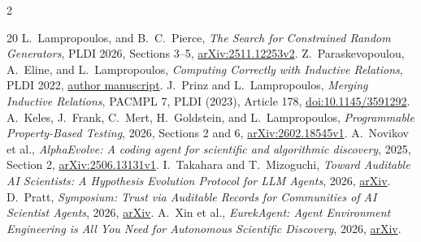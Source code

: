 \documentclass[10pt]{article}
\begin{document}
{\begin{multicols}{2}
\begin{thebibliography}{20}
L.~Lampropoulos, and B.~C.~Pierce, \emph{The Search for Constrained Random
Generators}, PLDI 2026, Sections 3--5,
\href{https://arxiv.org/abs/2511.12253v2}{arXiv:2511.12253v2}.
 Z.~Paraskevopoulou, A.~Eline, and L.~Lampropoulos,
\emph{Computing Correctly with Inductive Relations}, PLDI 2022,
\href{https://lemonidas.github.io/pdf/ComputingCorrectly.pdf}{author manuscript}.
 J.~Prinz and L.~Lampropoulos,
\emph{Merging Inductive Relations}, PACMPL 7, PLDI (2023), Article 178,
\href{https://doi.org/10.1145/3591292}{doi:10.1145/3591292}.
 A.~Keles, J.~Frank, C.~Mert, H.~Goldstein, and
L.~Lampropoulos, \emph{Programmable Property-Based Testing}, 2026,
Sections 2 and 6, \href{https://arxiv.org/abs/2602.18545v1}{arXiv:2602.18545v1}.
 A.~Novikov et al., \emph{AlphaEvolve: A coding agent
for scientific and algorithmic discovery}, 2025, Section 2,
\href{https://arxiv.org/abs/2506.13131v1}{arXiv:2506.13131v1}.
 I.~Takahara and T.~Mizoguchi, \emph{Toward Auditable AI
Scientists: A Hypothesis Evolution Protocol for LLM Agents}, 2026,
\href{https://doi.org/10.48550/arXiv.2607.09195}{arXiv}.
 D.~Pratt, \emph{Symposium: Trust via Auditable Records for
Communities of AI Scientist Agents}, 2026,
\href{https://doi.org/10.48550/arXiv.2608.19511}{arXiv}.
 A.~Xin et al., \emph{EurekAgent: Agent Environment
Engineering is All You Need for Autonomous Scientific Discovery}, 2026,
\href{https://doi.org/10.48550/arXiv.2606.13662}{arXiv}.
\end{thebibliography}
\end{multicols}
}
\end{document}
